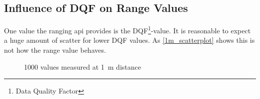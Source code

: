 %		
%
%		
%
%		


\subsection{Influence of DQF on Range Values}
One value the ranging api provides is the DQF\footnote{Data Quality Factor}-value.
It is reasonable to expect a huge amount of scatter for lower DQF values.
As \autoref{1m_scatterplot} shows this is not how the range value behaves.

\begin{figure}[h]
	\centering
	
	\caption{1000 values measured at \SI{1}{\metre} distance}
	\label{1m_scatterplot}
\end{figure}

